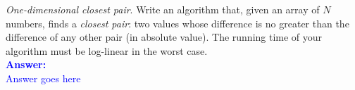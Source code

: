 \item{}
\emph{One-dimensional closest pair}\/. Write an algorithm that, given an array
of $N$ numbers, finds a \emph{closest pair}\/: two values whose difference is no
greater than the difference of any other pair (in absolute value). The running
time of your algorithm must be log-linear in the worst case.\\[12pt]
\ifanswers
\textcolor{blue}{
\textbf{Answer:}\\[6pt]
Answer goes here
}
\newpage
\fi
